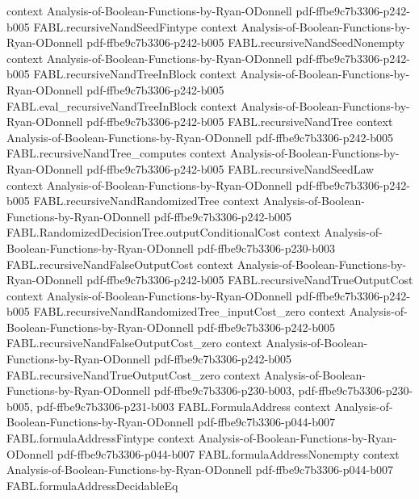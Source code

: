 \begin{theorem}
  {context}
  {Analysis-of-Boolean-Functions-by-Ryan-ODonnell}
  {pdf-ffbe9c7b3306-p242-b005}
\proofstep
  {FABL.recursiveNandSeedFintype}
  {context}
  {Analysis-of-Boolean-Functions-by-Ryan-ODonnell}
  {pdf-ffbe9c7b3306-p242-b005}
\proofstep
  {FABL.recursiveNandSeedNonempty}
  {context}
  {Analysis-of-Boolean-Functions-by-Ryan-ODonnell}
  {pdf-ffbe9c7b3306-p242-b005}
\proofstep
  {FABL.recursiveNandTreeInBlock}
  {context}
  {Analysis-of-Boolean-Functions-by-Ryan-ODonnell}
  {pdf-ffbe9c7b3306-p242-b005}
\proofstep
  {FABL.eval_recursiveNandTreeInBlock}
  {context}
  {Analysis-of-Boolean-Functions-by-Ryan-ODonnell}
  {pdf-ffbe9c7b3306-p242-b005}
\proofstep
  {FABL.recursiveNandTree}
  {context}
  {Analysis-of-Boolean-Functions-by-Ryan-ODonnell}
  {pdf-ffbe9c7b3306-p242-b005}
\proofstep
  {FABL.recursiveNandTree_computes}
  {context}
  {Analysis-of-Boolean-Functions-by-Ryan-ODonnell}
  {pdf-ffbe9c7b3306-p242-b005}
\proofstep
  {FABL.recursiveNandSeedLaw}
  {context}
  {Analysis-of-Boolean-Functions-by-Ryan-ODonnell}
  {pdf-ffbe9c7b3306-p242-b005}
\proofstep
  {FABL.recursiveNandRandomizedTree}
  {context}
  {Analysis-of-Boolean-Functions-by-Ryan-ODonnell}
  {pdf-ffbe9c7b3306-p242-b005}
\proofstep
  {FABL.RandomizedDecisionTree.outputConditionalCost}
  {context}
  {Analysis-of-Boolean-Functions-by-Ryan-ODonnell}
  {pdf-ffbe9c7b3306-p230-b003}
\proofstep
  {FABL.recursiveNandFalseOutputCost}
  {context}
  {Analysis-of-Boolean-Functions-by-Ryan-ODonnell}
  {pdf-ffbe9c7b3306-p242-b005}
\proofstep
  {FABL.recursiveNandTrueOutputCost}
  {context}
  {Analysis-of-Boolean-Functions-by-Ryan-ODonnell}
  {pdf-ffbe9c7b3306-p242-b005}
\proofstep
  {FABL.recursiveNandRandomizedTree_inputCost_zero}
  {context}
  {Analysis-of-Boolean-Functions-by-Ryan-ODonnell}
  {pdf-ffbe9c7b3306-p242-b005}
\proofstep
  {FABL.recursiveNandFalseOutputCost_zero}
  {context}
  {Analysis-of-Boolean-Functions-by-Ryan-ODonnell}
  {pdf-ffbe9c7b3306-p242-b005}
\proofstep
  {FABL.recursiveNandTrueOutputCost_zero}
  {context}
  {Analysis-of-Boolean-Functions-by-Ryan-ODonnell}
  {pdf-ffbe9c7b3306-p230-b003,
    pdf-ffbe9c7b3306-p230-b005,
    pdf-ffbe9c7b3306-p231-b003}
\proofstep
  {FABL.FormulaAddress}
  {context}
  {Analysis-of-Boolean-Functions-by-Ryan-ODonnell}
  {pdf-ffbe9c7b3306-p044-b007}
\proofstep
  {FABL.formulaAddressFintype}
  {context}
  {Analysis-of-Boolean-Functions-by-Ryan-ODonnell}
  {pdf-ffbe9c7b3306-p044-b007}
\proofstep
  {FABL.formulaAddressNonempty}
  {context}
  {Analysis-of-Boolean-Functions-by-Ryan-ODonnell}
  {pdf-ffbe9c7b3306-p044-b007}
\proofstep
  {FABL.formulaAddressDecidableEq}

\end{theorem}
